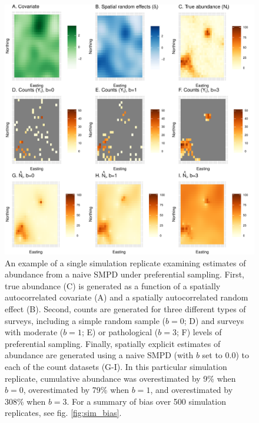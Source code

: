 \documentclass[times,mee,doublespace,]{besauth2}
\begin{document}
\begin{figure} %
\begin{center}
\includegraphics[width=170mm]{Pref_samp_sim_maps.pdf}
\caption{An example of a single simulation replicate examining estimates of abundance from a naive SMPD under preferential sampling.  First, true abundance (C) is generated as a function of a spatially autocorrelated covariate (A) and a spatially autocorrelated random effect (B). Second, counts are generated for three different types of surveys, including a simple random sample ($b=0$; D) and surveys with moderate ($b=1$; E) or pathological ($b=3$; F) levels of preferential sampling.  Finally, spatially explicit estimates of abundance are generated using a naive SMPD (with $b$ set to 0.0) to each of the count datasets (G-I).  In this particular simulation replicate, cumulative abundance was overestimated by 9\% when $b=0$, overestimated by 79\% when $b=1$, and overestimated by 308\% when $b=3$.  For a summary of bias over 500 simulation replicates, see fig. \ref{fig:sim_bias}.}
\label{fig:PS_sims}
\end{center}
\end{figure}
\end{document}
